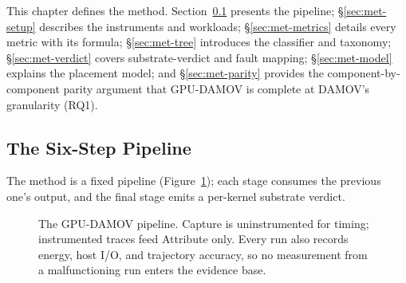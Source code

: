 \label{ch:method}

This chapter defines the method. Section~\ref{sec:met-pipeline} presents the pipeline; \S\ref{sec:met-setup} describes the instruments and workloads; \S\ref{sec:met-metrics} details every metric with its formula; \S\ref{sec:met-tree} introduces the classifier and taxonomy; \S\ref{sec:met-verdict} covers substrate-verdict and fault mapping; \S\ref{sec:met-model} explains the placement model; and \S\ref{sec:met-parity} provides the component-by-component parity argument that GPU-DAMOV is complete at DAMOV's granularity (RQ1).

\subsection{The Six-Step Pipeline}
\label{sec:met-pipeline}

The method is a fixed pipeline (Figure~\ref{fig:pipeline}); each stage consumes
the previous one's output, and the final stage emits a per-kernel substrate
verdict.

\begin{figure}[t]
\centering
{}
\caption[The GPU-DAMOV six-step pipeline.]{The GPU-DAMOV pipeline. Capture is
uninstrumented for timing; instrumented traces feed Attribute only. Every run
also records energy, host I/O, and trajectory accuracy, so no measurement from a
malfunctioning run enters the evidence base.}
\label{fig:pipeline}
\end{figure}

